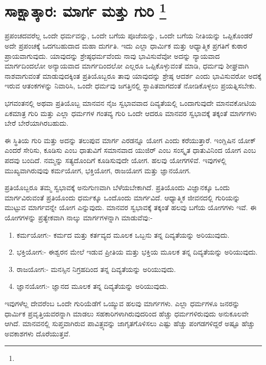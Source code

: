 
\chapter[ಸಾಕ್ಷಾತ್ಕಾರ: ಮಾರ್ಗ ಮತ್ತು ಗುರಿ ]{ಸಾಕ್ಷಾತ್ಕಾರ: ಮಾರ್ಗ ಮತ್ತು ಗುರಿ \protect\footnote{}}

ಪ್ರಪಂಚದವರೆಲ್ಲ ಒಂದೇ ಧರ್ಮವನ್ನು, ಒಂದೇ ಬಗೆಯ ಪೂಜೆಯನ್ನು, ಒಂದೇ ಬಗೆಯ ನೀತಿಯನ್ನು ಒಪ್ಪಿಕೊಂಡರೆ ಅದೇ ಪ್ರಪಂಚಕ್ಕೆ ಒದಗಬಹುದಾದ ಮಹಾ ದುರ್ಗತಿ. ಇದು ಎಲ್ಲಾ ಧಾರ್ಮಿಕ ಮತ್ತು ಆಧ್ಯಾತ್ಮಿಕ ಪ್ರಗತಿಗೆ ಕುಠಾರ ಪ್ರಾಯವಾಗುವುದು. ಯಾವುದನ್ನು ಶ್ರೇಷ್ಠಧರ್ಮವೆಂದು ನಾವು ಭಾವಿಸುವೆವೋ ಅದನ್ನು ನ್ಯಾಯವಾದ ಮಾರ್ಗದಿಂದಲೋ ಅನ್ಯಾಯವಾದ ಮಾರ್ಗದಿಂದಲೋ ಎಲ್ಲರೂ ಒಪ್ಪಿಕೊಳ್ಳುವಂತೆ ಮಾಡಿ, ಧರ್ಮವು ಶೀಘ್ರವಾಗಿ ನಾಶವಾಗುವಂತೆ ಮಾಡುವುದಕ್ಕಿಂತ ಪ್ರತಿಯೊಬ್ಬರೂ ತಾವು ಯಾವುದನ್ನು ಶ್ರೇಷ್ಠ ಆದರ್ಶ ಎಂದು ಭಾವಿಸುವರೋ ಅದಕ್ಕೆ ಇರುವ ಆತಂಕಗಳನ್ನು ನಿವಾರಿಸಿ, ಒಂದೇ ಧರ್ಮವು ಜಗತ್ತಿನಲ್ಲಿ ಸ್ಥಾಪಿತವಾಗದಂತೆ ನೋಡಿಕೊಳ್ಳಲು ಪ್ರಯತ್ನಿಸಬೇಕು.

ಭಗವಂತನಲ್ಲಿ ಅಥವಾ ಪ್ರತಿಯೊಬ್ಬ ಮಾನವನ ನೈಜ ಸ್ವಭಾವವಾದ ದಿವ್ಯತೆಯಲ್ಲಿ ಒಂದಾಗುವುದೇ ಮಾನವಕೋಟಿಯ ಏಕಮಾತ್ರ ಗುರಿ ಮತ್ತು ಎಲ್ಲಾ ಧರ್ಮಗಳ ಗಂತವ್ಯ ಗುರಿ ಒಂದೇ ಆದರೂ ಮಾನವರ ಸ್ವಭಾವಕ್ಕೆ ತಕ್ಕಂತೆ ಮಾರ್ಗಗಳು ಬೇರೆ ಬೇರೆಯಾಗಿರಬಹುದು.

ಈ ಸ್ಥಿತಿಯ ಗುರಿ ಮತ್ತು ಅದನ್ನು ತಲುಪುವ ಮಾರ್ಗ ಎರಡನ್ನೂ ಯೋಗ ಎಂದು ಕರೆಯುತ್ತಾರೆ. ಇಂಗ್ಲಿಷಿನ ಯೋಕ್​ ಎಂದರೆ ಸೇರಿಸು, ಕೂಡಿಸು ಎಂಬ ಧಾತುವಿಗೆ ಸಮಾನವಾದ ಯುಜಿರ್​ ಎಂಬ ಸಂಸ್ಕೃತ ಧಾತುವಿನಿಂದ ಯೋಗ ಎಂಬ ಪದವು ಬಂದಿದೆ. ನಮ್ಮನ್ನು ಸತ್ಯದೊಂದಿಗೆ ಕೂಡಿಸುವುದೇ ಯೋಗ. ಹಲವು ಯೋಗಗಳಿವೆ. ಇವುಗಳಲ್ಲಿ ಮುಖ್ಯವಾಗಿರುವುವು ಕರ್ಮಯೋಗ, ಭಕ್ತಿಯೋಗ, ರಾಜಯೋಗ ಮತ್ತು ಜ್ಞಾನಯೋಗ.

ಪ್ರತಿಯೊಬ್ಬರೂ ತಮ್ಮ ಸ್ವಭಾವಕ್ಕೆ ಅನುಗುಣವಾಗಿ ಬೆಳೆಯಬೇಕಾಗಿದೆ. ಪ್ರತಿಯೊಂದು ವಿಜ್ಞಾನಕ್ಕೂ ಒಂದು ಮಾರ್ಗವಿರುವಂತೆ ಪ್ರತಿಯೊಂದು ಧರ್ಮಕ್ಕೂ ಒಂದೊಂದು ಮಾರ್ಗವಿದೆ. ಆಧ್ಯಾತ್ಮಿಕ ಜೀವನದಲ್ಲಿ ಗುರಿಯನ್ನು ಮುಟ್ಟುವ ಮಾರ್ಗವನ್ನೇ ಯೋಗ ಎನ್ನುವುದು. ಮಾನವರ ಸ್ವಭಾವಕ್ಕೆ ತಕ್ಕಂತೆ ಹಲವು ಬಗೆಯ ಯೋಗಗಳು ಇವೆ. ಈ ಯೋಗಗಳನ್ನು ಪ್ರತ್ಯೇಕವಾಗಿ ನಾಲ್ಕು ಮಾರ್ಗಗಳನ್ನಾಗಿ ಮಾಡುವೆವು:-

\begin{enumerate}
\item ಕರ್ಮಯೋಗ:- ಕರ್ಮದ ಮತ್ತು ಕರ್ತವ್ಯದ ಮೂಲಕ ಒಬ್ಬನು ತನ್ನ ದಿವ್ಯತೆಯನ್ನು ಅರಿಯುವುದು.

 \item ಭಕ್ತಿಯೋಗ:- ಈಶ್ವರನ ಮೇಲೆ ಇಡುವ ಪ್ರೀತಿಯ ಮತ್ತು ಭಕ್ತಿಯ ಮೂಲಕ ತನ್ನ ದಿವ್ಯತೆಯನ್ನು ಅರಿಯುವುದು.

 \item ರಾಜಯೋಗ:- ಮನಸ್ಸಿನ ನಿಗ್ರಹದಿಂದ ತನ್ನ ದಿವ್ಯತೆಯನ್ನು ಅರಿಯುವುದು.

 \item ಜ್ಞಾನಯೋಗ:- ಜ್ಞಾನದ ಮೂಲಕ ತನ್ನ ದಿವ್ಯತೆಯನ್ನು ಅರಿಯುವುದು.

\end{enumerate}

ಇವುಗಳೆಲ್ಲ ದೇವರೆಂಬ ಒಂದೇ ಗುರಿಯೆಡೆಗೆ ಒಯ್ಯುವ ಹಲವು ಮಾರ್ಗಗಳು. ಎಲ್ಲಾ ಧರ್ಮಗಳೂ ಜನರನ್ನು ಧಾರ್ಮಿಕ ಪ್ರವೃತ್ತಿಯವರನ್ನಾಗಿ ಮಾಡಲು ಸಹಕಾರಿಗಳಾಗಿರುವುದರಿಂದ ಹೆಚ್ಚು ಧರ್ಮಗಳಿರುವುದು ಅನುಕೂಲವೇ ಆಗಿದೆ. ಮಾನವನಲ್ಲಿ ಸುಪ್ತವಾಗಿರುವ ಪಾವಿತ್ರ್ಯವನ್ನು ಜಾಗೃತಗೊಳಿಸಲು ಎಷ್ಟು ಹೆಚ್ಚು ಪಂಗಡಗಳಿದ್ದರೆ ಅಷ್ಟೂ ಹೆಚ್ಚು ಅವಕಾಶಗಳು ದೊರೆಯುತ್ತವೆ.

